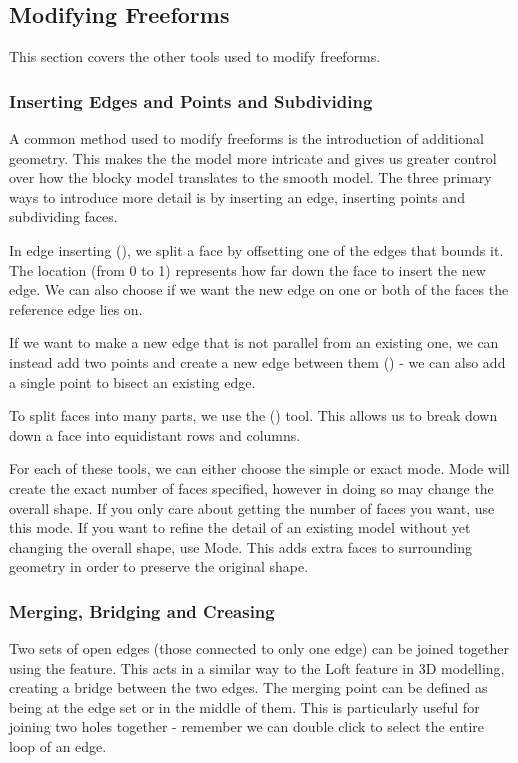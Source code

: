 \subsection{Modifying Freeforms}

This section covers the other tools used to modify freeforms.

\subsubsection{Inserting Edges and Points and Subdividing}

A common method used to modify freeforms is the introduction of additional geometry. This makes the the model more intricate and gives us greater control over how the blocky model translates to the smooth model. The three primary ways to introduce more detail is by inserting an edge, inserting points and subdividing faces.

In edge inserting (), we split a face by offsetting one of the edges that bounds it. The location (from 0 to 1) represents how far down the face to insert the new edge. We can also choose if we want the new edge on one or both of the faces the reference edge lies on. 

If we want to make a new edge that is not parallel from an existing one, we can instead add two points and create a new edge between them () - we can also add a single point to bisect an existing edge. 

To split faces into many parts, we use the () tool. This allows us to break down down a face into equidistant rows and columns.

For each of these tools, we can either choose the simple or exact mode.  Mode will create the exact number of faces specified, however in doing so may change the overall shape. If you only care about getting the number of faces you want, use this mode. If you want to refine the detail of an existing model without yet changing the overall shape, use  Mode. This adds extra faces to surrounding geometry in order to preserve the original shape.

\subsubsection{Merging, Bridging and Creasing}
\mediumdifficulty

Two sets of open edges (those connected to only one edge) can be joined together using the  feature. This acts in a similar way to the Loft feature in 3D modelling, creating a bridge between the two edges. The merging point can be defined as being at the edge set or in the middle of them. This is particularly useful for joining two holes together - remember we can double click to select the entire loop of an edge.

